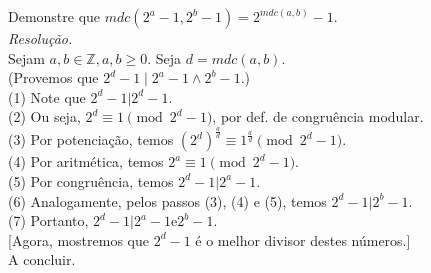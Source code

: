 Demonstre que $mdc(2^a - 1, 2^b - 1) = 2^{mdc(a, b)} - 1$. \\
\emph{Resolução.} \\
Sejam $a, b \in \mathbb{Z}, a, b \ge 0$. Seja $d = mdc(a, b)$. \\
(Provemos que $2^d - 1 \mid 2^a - 1 \land 2^b - 1$.) \\
(1) Note que $2^d - 1 | 2^d - 1$. \\
(2) Ou seja, $2^d \equiv 1 \pmod{2^d - 1}$, por def. de congruência modular. \\
(3) Por potenciação, temos $(2^d)^\frac{a}{d} \equiv 1^\frac{a}{d} \pmod{2^d - 1}$. \\
(4) Por aritmética, temos $2^a \equiv 1 \pmod{2^d - 1}$. \\
(5) Por congruência, temos $2^d - 1 | 2^a - 1$. \\
(6) Analogamente, pelos passos (3), (4) e (5), temos $2^d - 1 | 2^b - 1$. \\
(7) Portanto, $2^d - 1 | 2^a - 1 \text{e} 2^b - 1$. \\

[Agora, mostremos que $2^d - 1$ é o melhor divisor destes números.] \\
A concluir.
